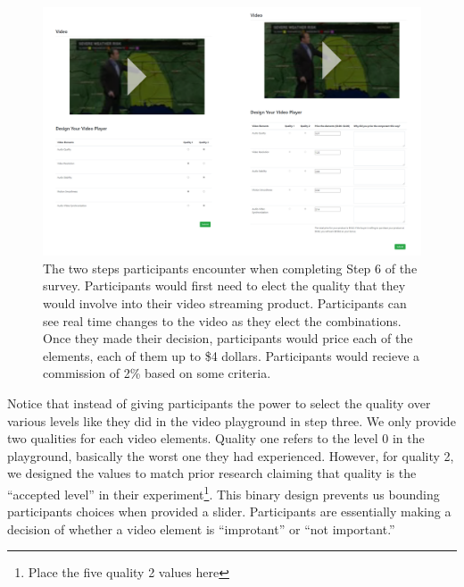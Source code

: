 \begin{figure}[htpb]
    \centering
    \includegraphics[width=\textwidth, keepaspectratio=true]{content/image/design_task.png}
    \caption{
        The two steps participants encounter when completing Step 6 of the survey. Participants would first need to elect the quality that they would involve into their video streaming product. Participants can see real time changes to the video as they elect the combinations. Once they made their decision, participants would price each of the elements, each of them up to \$4 dollars. Participants would recieve a commission of 2\% based on some criteria.
    }
    \label{fig:exp2_store}
\end{figure}

Notice that instead of giving participants the power to select the quality over various levels like they did in the video playground in step three. We only provide two qualities for each video elements. Quality one refers to the level 0 in the playground, basically the worst one they had experienced. However, for quality 2, we designed the values to match prior research claiming that quality is the ``accepted level'' in their experiment\footnote{Place the five quality 2 values here}. This binary design prevents us bounding participants choices when provided a slider. Participants are essentially making a decision of whether a video element is ``improtant'' or ``not important.''

